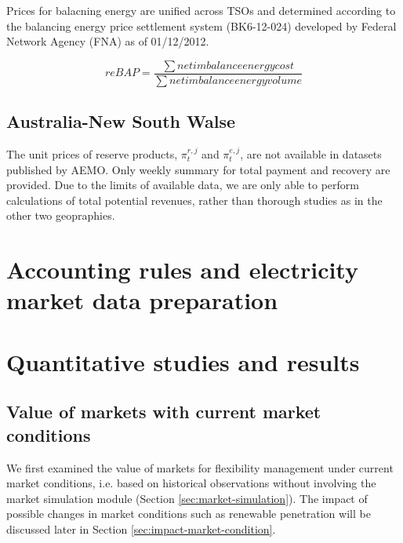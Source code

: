 

Prices for balacning energy are unified across TSOs and determined according to the  balancing energy price settlement system (BK6-12-024) developed by Federal Network Agency (FNA) as of 01/12/2012.

\begin{equation}
\label{eq:reBAP}
reBAP = \frac{\sum net imbalance energy cost}{\sum net imbalance energy volume}
\end{equation}

\subsection{Australia-New South Walse}
The unit prices of reserve products, $\pi_t^{r,j}$ and $\pi_t^{e,j}$, are not available in datasets published by AEMO. Only weekly summary for total payment and recovery are provided. Due to the limits of available data, we are only able to perform calculations of total potential revenues, rather than thorough studies as in the other two geopraphies.

\section{Accounting rules and electricity market data preparation}
\label{sec:accounting-data-prepare}
\newpage

\section{Quantitative studies and results}

\subsection{Value of markets with current market conditions}
We first examined the value of markets for flexibility management under current market conditions, i.e. based on historical observations without involving the market simulation module (Section \ref{sec:market-simulation}). The impact of possible changes in market conditions such as renewable penetration will be discussed later in Section \ref{sec:impact-market-condition}.

